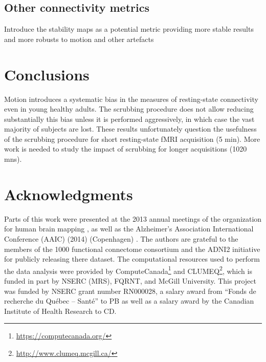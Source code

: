 \documentclass[authoryear]{elsarticle}
\begin{document}
 

\subsection{Other connectivity metrics}
Introduce the stability maps as a potential metric providing more stable results and more robusts to motion and other artefacts


\section{Conclusions}
Motion introduces a systematic bias in the measures of resting-­state connectivity even in young healthy adults. The scrubbing procedure does not allow reducing substantially this bias unless it is performed aggressively, in which case the vast majority of subjects are lost. These results unfortunately question the usefulness of the scrubbing procedure for short resting­-state fMRI acquisition (5 min). More work is needed to study the impact of scrubbing for longer acquisitions (10­20 mns).

\section{Acknowledgments}
Parts of this work were presented at the 2013 annual meetings of the organization for human brain mapping \citep{?}, as well as the  Alzheimer's Association International Conference (AAIC) (2014) (Copenhagen) \citep{?}. The authors are grateful to the members of the 1000 functional connectome consortium  and the ADNI2 initiative for publicly releasing there dataset. The computational resources used to perform the data analysis were provided by ComputeCanada\footnote{\url{https://computecanada.org/}} and CLUMEQ\footnote{\url{http://www.clumeq.mcgill.ca/}}, which is funded in part by NSERC (MRS), FQRNT, and McGill University. This project was funded by NSERC grant number RN000028, a salary award from ``Fonds de recherche du Qu\'ebec -- Sant\'e'' to PB as well as a salary award by the Canadian Institute of Health Research to CD.
\end{document}
